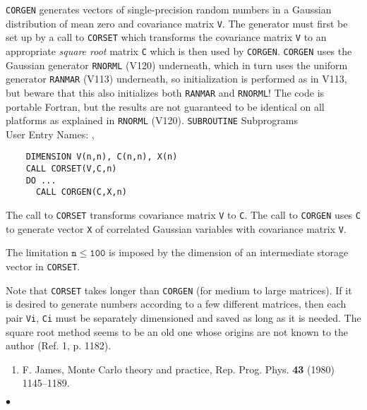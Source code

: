                        
             
\Submitter{}          
 
{\tt CORGEN} generates vectors of single-precision random numbers
in a Gaussian distribution of mean zero and covariance matrix {\tt V}.
The generator must first be set up by a call to {\tt CORSET} which
transforms the covariance matrix {\tt V} to an appropriate
{\it square root} matrix {\tt C} which is then used by {\tt CORGEN}.
{\tt CORGEN} uses the Gaussian generator {\tt RNORML} (V120) underneath,
which in turn uses the uniform generator {\tt RANMAR} (V113) underneath,
so initialization is performed as in V113, but beware that this
also initializes both {\tt RANMAR} and {\tt RNORML}!
The code is portable Fortran, but the results are not guaranteed
to be identical on all platforms as explained in {\tt RNORML} (V120).
\Structure
{\tt SUBROUTINE} Subprograms\\
User Entry Names: , 
\Usage
\begin{verbatim}
    DIMENSION V(n,n), C(n,n), X(n)
    CALL CORSET(V,C,n)
    DO ...
      CALL CORGEN(C,X,n)
\end{verbatim}
The call to {\tt CORSET} transforms covariance matrix {\tt V} to {\tt C}.
The call to {\tt CORGEN} uses {\tt C} to generate vector {\tt X} of
correlated Gaussian variables with covariance matrix {\tt V}.
\par
The limitation $\mathtt{n \le 100}$ is imposed by the dimension of an
intermediate storage vector in {\tt CORSET}.
\par
Note that {\tt CORSET} takes longer than {\tt CORGEN}
(for medium to large matrices).
If it is desired to generate numbers according to a few different
matrices, then each pair {\tt Vi}, {\tt Ci} must be separately
dimensioned and saved as long as it is needed.
\Method
The square root method seems to be an old one whose origins are not
known to the author (Ref. 1, p. 1182).
\Refer
\begin{enumerate}
\item F. James, Monte Carlo theory and practice,
Rep. Prog. Phys. {\bf 43} (1980) 1145--1189.
\end{enumerate}
$\bullet$
